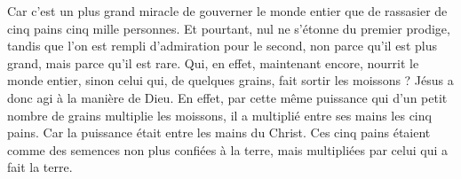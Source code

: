 Car c’est un plus grand miracle de gouverner le monde entier que de rassasier de cinq pains cinq mille personnes. Et pourtant, nul ne s’étonne du premier prodige, tandis que l’on est rempli d’admiration pour le second, non parce qu’il est plus grand, mais parce qu’il est rare. Qui, en effet, maintenant encore, nourrit le monde entier, sinon celui qui, de quelques grains, fait sortir les moissons ? Jésus a donc agi à la manière de Dieu. En effet, par cette même puissance qui d’un petit nombre de grains multiplie les moissons, il a multiplié entre ses mains les cinq pains. Car la puissance était entre les mains du Christ. Ces cinq pains étaient comme des semences non plus confiées à la terre, mais multipliées par celui qui a fait la terre.
